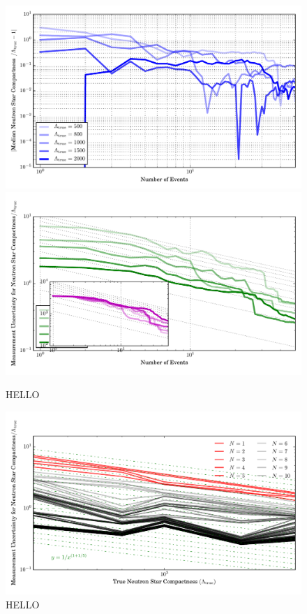 \documentclass[aps,prd,amsmath,floats,floatfix, twocolumn,
superscriptaddress,nofootinbib,showpacs]{revtex4-1}
\begin{document}
\begin{figure}
\centering    
\includegraphics[width=1.\columnwidth]{plots/RelErrorLambdaMedian_vs_N.pdf}
\includegraphics[width=1.\columnwidth]{plots/LambdaCIWidths_vs_N.pdf}
\caption{HELLO
}
\label{fig:TT_LambdaError_vs_N_L500_2000_CI90_0}
\end{figure}
%

% 
\begin{figure}
\centering    
\includegraphics[width=1.\columnwidth]{plots/LambdalErrorBars_vs_Lambda_N49_Log.pdf}
\caption{HELLO
}
\label{fig:TT_Lambda_vs_Lambda_L500_2000_CI90_0_AllInOne}
\end{figure}
%
\end{document}
